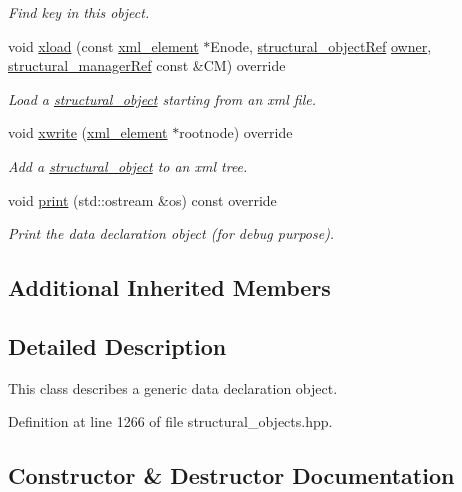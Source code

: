 \begin{DoxyCompactItemize}
\begin{DoxyCompactList}\small\item\em Find key in this object. \end{DoxyCompactList}\item 
void \hyperlink{classdata__o_ad0691851ebfeff0d27a8334669714482}{xload} (const \hyperlink{classxml__element}{xml\+\_\+element} $\ast$Enode, \hyperlink{structural__objects_8hpp_a8ea5f8cc50ab8f4c31e2751074ff60b2}{structural\+\_\+object\+Ref} \hyperlink{classstructural__object_a3e96b3e00b8a78adfc44872d82e186ea}{owner}, \hyperlink{structural__manager_8hpp_ab3136f0e785d8535f8d252a7b53db5b5}{structural\+\_\+manager\+Ref} const \&CM) override
\begin{DoxyCompactList}\small\item\em Load a \hyperlink{classstructural__object}{structural\+\_\+object} starting from an xml file. \end{DoxyCompactList}\item 
void \hyperlink{classdata__o_a80c100b49475f7279913eed46a728366}{xwrite} (\hyperlink{classxml__element}{xml\+\_\+element} $\ast$rootnode) override
\begin{DoxyCompactList}\small\item\em Add a \hyperlink{classstructural__object}{structural\+\_\+object} to an xml tree. \end{DoxyCompactList}\item 
void \hyperlink{classdata__o_a80e5ba60fe957aff679319a442c171b3}{print} (std\+::ostream \&os) const override
\begin{DoxyCompactList}\small\item\em Print the data declaration object (for debug purpose). \end{DoxyCompactList}\end{DoxyCompactItemize}
\subsection*{Additional Inherited Members}


\subsection{Detailed Description}
This class describes a generic data declaration object. 

Definition at line 1266 of file structural\+\_\+objects.\+hpp.



\subsection{Constructor \& Destructor Documentation}
\mbox{\label{classdata__o_a574a6c6a5f9c712ddd3e29504434b812}} 

